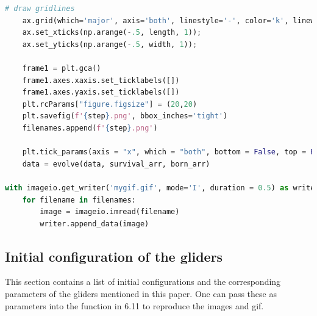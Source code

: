 \documentclass[12pt]{article}
\numberwithin{figure}{section} %
\begin{document}
\begin{lstlisting}[language = Python]
    # draw gridlines
    ax.grid(which='major', axis='both', linestyle='-', color='k', linewidth=2)
    ax.set_xticks(np.arange(-.5, length, 1));
    ax.set_yticks(np.arange(-.5, width, 1));

    frame1 = plt.gca()
    frame1.axes.xaxis.set_ticklabels([])
    frame1.axes.yaxis.set_ticklabels([])
    plt.rcParams["figure.figsize"] = (20,20)
    plt.savefig(f'{step}.png', bbox_inches='tight')
    filenames.append(f'{step}.png')
    
    plt.tick_params(axis = "x", which = "both", bottom = False, top = False)
    data = evolve(data, survival_arr, born_arr)

with imageio.get_writer('mygif.gif', mode='I', duration = 0.5) as writer:
    for filename in filenames:
        image = imageio.imread(filename)
        writer.append_data(image)
\end{lstlisting}

\subsection{Initial configuration of the gliders}
This section contains a list of initial configurations and the corresponding parameters of the gliders mentioned in this paper. One can pass these as parameters into the function in 6.11 to reproduce the images and gif. 
\end{document}
